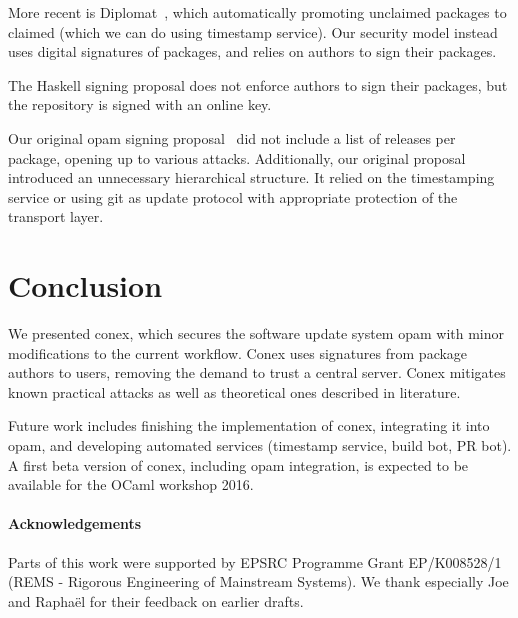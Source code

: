 \documentclass[nocopyrightspace]{sigplanconf}
\begin{document}
More recent is Diplomat~\cite{diplomat}, which automatically promoting unclaimed packages to claimed (which we can do using timestamp service).
Our security model instead uses digital signatures of packages, and relies on authors to sign their packages.

The Haskell signing proposal does not enforce authors to sign their packages, but the repository is signed with an online key.

Our original opam signing proposal~\cite{opamsigning} did not include a list of releases per package, opening up to various attacks.
Additionally, our original proposal introduced an unnecessary hierarchical structure.
It relied on the timestamping service or using git as update protocol with appropriate protection of the transport layer.


\section{Conclusion} \label{sec:conclusion}
We presented conex, which secures the software update system opam with minor modifications to the current workflow.
Conex uses signatures from package authors to users, removing the demand to trust a central server.
Conex mitigates known practical attacks as well as theoretical ones described in literature.

Future work includes finishing the implementation of conex, integrating it into opam, and developing automated services (timestamp service, build bot, PR bot).
A first beta version of conex, including opam integration, is expected to be available for the OCaml workshop 2016.

\paragraph{Acknowledgements} Parts of this work were supported by EPSRC Programme Grant EP/K008528/1 (REMS - Rigorous Engineering of Mainstream Systems).  We thank especially Joe and Rapha\"el for their feedback on earlier drafts.



\end{document}
